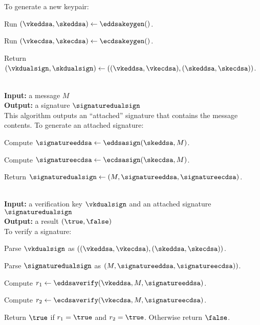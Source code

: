\vspace{-1.5em}
To generate a new keypair:

\vspace{-1.5em}
\begingroup
\RaggedRight
\begin{enumerate*}
\item Run $(\vkeddsa, \skeddsa) \leftarrow \eddsakeygen()$.
\item Run $(\vkecdsa, \skecdsa) \leftarrow \ecdsakeygen()$.
\item Return $(\vkdualsign, \skdualsign) \leftarrow \left( (\vkeddsa,\vkecdsa), (\skeddsa,\skecdsa) \right)$.
\end{enumerate*}
\endgroup


{\underline {\bf \dualsignsign}}\\
{\bf Input:} a message $M$\\
{\bf Output:} a signature $\signaturedualsign$ \\

\vspace{-1.5em}
This algorithm outputs an ``attached'' signature that contains the message contents. To generate an attached signature:

\vspace{-1.5em}
\begingroup
\RaggedRight
\begin{enumerate*}
\item Compute $\signatureeddsa \leftarrow \eddsasign(\skeddsa, M)$.
\item Compute $\signatureecdsa \leftarrow \ecdsasign(\skecdsa, M)$.
\item Return $\signaturedualsign \leftarrow \left(M, \signatureeddsa, \signatureecdsa \right)$.
\end{enumerate*}
\endgroup


{\underline {\bf \dualsignverify}}\\
{\bf Input:} a verification key $\vkdualsign$ and an attached signature $\signaturedualsign$\\
{\bf Output:} a result $(\true, \false)$ \\

\vspace{-1.5em}
To verify a signature:

\vspace{-1.5em}
\begin{enumerate*}
\item Parse $\vkdualsign$ as $\left( (\vkeddsa,\vkecdsa), (\skeddsa,\skecdsa) \right)$.
\item Parse $\signaturedualsign$ as $\left( M, \signatureeddsa, \signatureecdsa) \right)$.
\item Compute $r_1 \leftarrow \eddsaverify(\vkeddsa, M, \signatureeddsa)$.
\item Compute $r_2 \leftarrow \ecdsaverify(\vkecdsa, M, \signatureecdsa)$.
\item Return $\true$ if $r_1 = \true$ and $r_2 = \true$. Otherwise return $\false$.
\end{enumerate*}

